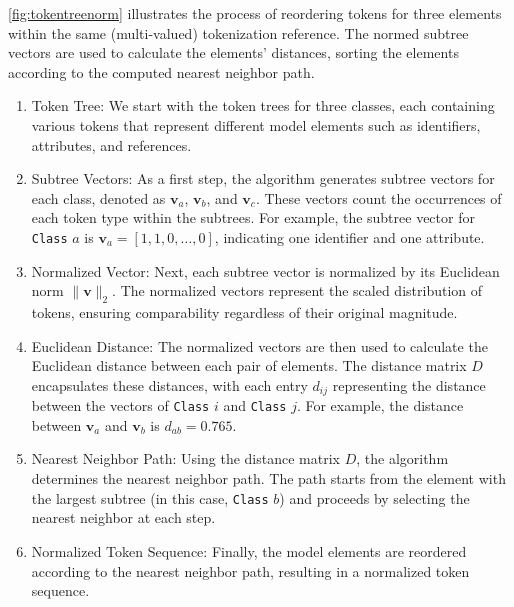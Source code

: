 \autoref{fig:tokentreenorm} illustrates the process of reordering tokens for three elements within the same (multi-valued) tokenization reference. The normed subtree vectors are used to calculate the elements' distances, sorting the elements according to the computed nearest neighbor path.
\begin{enumerate}
    \item {Token Tree}: We start with the token trees for three classes, each containing various tokens that represent different model elements such as identifiers, attributes, and references.
    \item {Subtree Vectors}: As a first step, the algorithm generates subtree vectors for each class, denoted as \( \mathbf{v}_a \), \( \mathbf{v}_b \), and \( \mathbf{v}_c \). These vectors count the occurrences of each token type within the subtrees. For example, the subtree vector for \texttt{Class} $a$ is \( \mathbf{v}_a = [1, 1, 0, \dots, 0] \), indicating one identifier and one attribute.

    \item {Normalized Vector}: Next, each subtree vector is normalized by its Euclidean norm \( \|\mathbf{v}\|_2 \). The normalized vectors represent the scaled distribution of tokens, ensuring comparability regardless of their original magnitude.

    \item {Euclidean Distance}: The normalized vectors are then used to calculate the Euclidean distance between each pair of elements. The distance matrix \( D \) encapsulates these distances, with each entry \( d_{ij} \) representing the distance between the vectors of \texttt{Class} $i$ and \texttt{Class} $j$. For example, the distance between \( \mathbf{v}_a \) and \( \mathbf{v}_b \) is \( d_{ab} = 0.765 \).

    \item {Nearest Neighbor Path}: Using the distance matrix \( D \), the algorithm determines the nearest neighbor path. The path starts from the element with the largest subtree (in this case, \texttt{Class} $b$) and proceeds by selecting the nearest neighbor at each step.

    \item {Normalized Token Sequence}: Finally, the model elements are reordered according to the nearest neighbor path, resulting in a normalized token sequence.
\end{enumerate}


